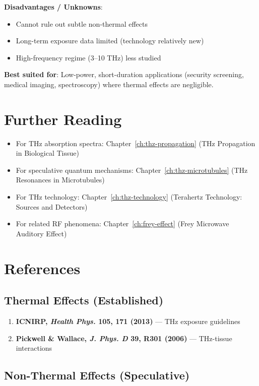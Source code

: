 \textbf{Disadvantages / Unknowns}:
\begin{itemize}
\item Cannot rule out subtle non-thermal effects
\item Long-term exposure data limited (technology relatively new)
\item High-frequency regime (3--10 THz) less studied
\end{itemize}

\textbf{Best suited for}: Low-power, short-duration applications (security screening, medical imaging, spectroscopy) where thermal effects are negligible.

\section{Further Reading}

\begin{itemize}
\item For THz absorption spectra: Chapter~\ref{ch:thz-propagation} (THz Propagation in Biological Tissue)
\item For speculative quantum mechanisms: Chapter~\ref{ch:thz-microtubules} (THz Resonances in Microtubules)
\item For THz technology: Chapter~\ref{ch:thz-technology} (Terahertz Technology: Sources and Detectors)
\item For related RF phenomena: Chapter~\ref{ch:frey-effect} (Frey Microwave Auditory Effect)
\end{itemize}

\section{References}

\subsection{Thermal Effects (Established)}

\begin{enumerate}
\item \textbf{ICNIRP, \emph{Health Phys.} 105, 171 (2013)} --- THz exposure guidelines
\item \textbf{Pickwell \& Wallace, \emph{J. Phys. D} 39, R301 (2006)} --- THz-tissue interactions
\end{enumerate}

\subsection{Non-Thermal Effects (Speculative)}

